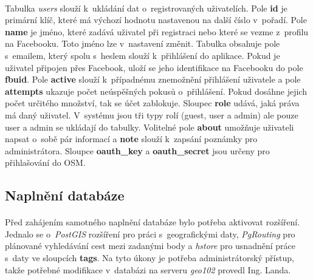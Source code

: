\documentclass[11pt,a4paper,titlepage,oneside]{book}
\begin{document}
			\paragraph{}\label{par:users}Tabulka \textit{users} slouží k~ukládání dat o~registrovaných uživatelích. Pole \textbf{id} je primární klíč, které má výchozí hodnotu nastavenou na další číslo v~pořadí. Pole \textbf{name} je jméno, které zadává uživatel při registraci nebo které se vezme z~profilu na Facebooku. Toto jméno lze v~nastavení změnit. Tabulka obsahuje pole s~emailem, který spolu s~heslem slouží k~přihlášení do aplikace. Pokud je uživatel připojen přes Facebook, uloží se jeho identifikace na Facebooku do pole \textbf{fbuid}. Pole \textbf{active} slouží k~případnému znemožnění přihlášení uživatele a pole \textbf{attempts} ukazuje počet neúspěšných pokusů o~přihlášení. Pokud dosáhne jejich počet určitého množství, tak se účet zablokuje. Sloupec \textbf{role} udává, jaká práva má daný uživatel. V~systému jsou tři typy rolí (guest, user a admin) ale pouze user a admin se ukládají do tabulky. Volitelné pole \textbf{about} umožňuje uživateli napsat o~sobě pár informací a \textbf{note} slouží k~zapsání poznámky pro administrátora. Sloupce \textbf{oauth\_key} a \textbf{oauth\_secret} jsou určeny pro přihlašování do \acl{OSM}.



			\subsection{Naplnění databáze}
				\paragraph{} Před zahájením samotného naplnění databáze bylo potřeba aktivovat rozší\-ření. Jednalo se o~\textit{PostGIS} rozšíření pro práci s~geografickými daty, \textit{PgRouting} pro plánované vyhledávání cest mezi zadanými body a \textit{hstore} pro usnadnění práce s~daty ve sloupcích \textbf{tags}. Na tyto úkony je potřeba administrátorský přístup, takže potřebné modifikace v~databázi na serveru \textit{geo102} provedl Ing. Landa.
\end{document}
